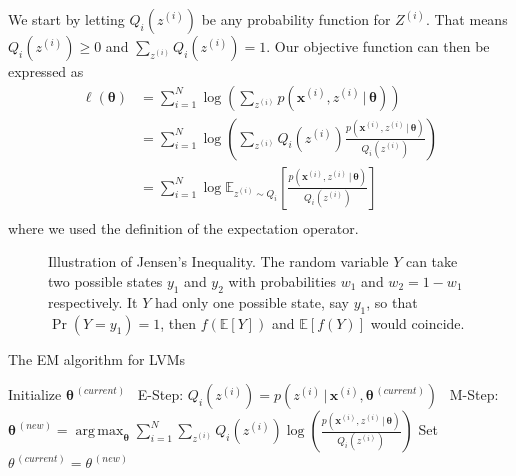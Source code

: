 \documentclass[final,3p,times,twocolumn]{elsarticle}
\DeclareMathOperator*{\argmax}{arg\,max}
\let\bs\boldsymbol
\begin{document}
We start by letting $Q_i(z^{(i)})$ be any probability function for $Z^{(i)}$. 
That means $Q_i(z^{(i)}) \geq 0$ and $\sum_{z^{(i)}} Q_i(z^{(i)}) = 1$. 
Our objective function can then be expressed as
\begin{equation*}
\begin{split}
\ell(\bs\theta) &= \sum_{i=1}^N \log\left(\sum_{z^{(i)}} p(\bs x^{(i)},z^{(i)}\,|\,\bs\theta)\right)\\
&= \sum_{i=1}^N \log \left(\sum_{z^{(i)}} Q_i(z^{(i)}) \frac{p(\bs x^{(i)},z^{(i)}\,|\,\bs\theta)}{Q_i(z^{(i)})}\right)\\
&= \sum_{i=1}^N \log \mathbb{E}_{z^{(i)} \sim Q_i}\left[\frac{p(\bs x^{(i)},z^{(i)}\,|\,\bs\theta)}{Q_i(z^{(i)})}\right]\\
\end{split}
\end{equation*}
where we used the definition of the expectation operator.

\begin{figure}
\caption{Illustration of Jensen's Inequality.
The random variable $Y$ can take two possible states $y_1$ and $y_2$ with probabilities $w_1$ and $w_2=1-w_1$ respectively.
It $Y$ had only one possible state, say $y_1$, so that $\Pr(Y=y_1)=1$, then $f\left(\mathbb{E}[Y]\right)$ and $\mathbb{E}\left[f(Y)\right]$ would coincide.
}
\label{fig:jensen}
\end{figure}

\begin{algorithm}
\caption{The EM algorithm for LVMs}
\label{alg:EM}
\begin{algorithmic}[1]
\State Initialize $\bs\theta^{\,(current)}$
\Statex\Repeat
\Statex \quad\, E-Step:
\State $Q_i(z^{(i)}) = p(z^{(i)}\,|\,\bs x^{(i)},\bs\theta^{\,(current)})$
\EndFor
\Statex\Statex \quad\, M-Step:
\State $\bs\theta^{\,(new)} = \argmax_{\bs\theta}\sum_{i=1}^N \sum_{z^{(i)}} Q_i(z^{(i)}) \log \left( \frac{p(\bs x^{(i)},z^{(i)}\,|\,\bs\theta)}{Q_i(z^{(i)})}\right)$
\State Set $\theta^{\,(current)} = \theta^{\,(new)}$
\Statex\State\Return{  $\bs\theta^{\,(current)},z^{(1)}, \dots, z^{(N)}$}
\end{algorithmic}
\end{algorithm}
\end{document}
